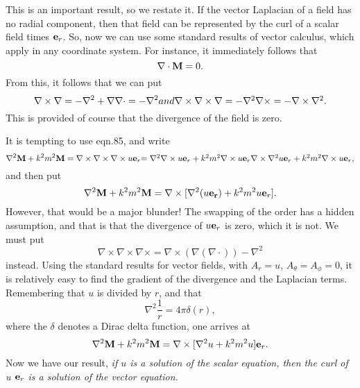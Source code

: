 This is an important result, so we restate it. If the vector Laplacian
of a field has no radial component, then that field can be represented
 by the curl of a scalar field times ${\bf e}_r$. So, now we can use
some standard results of vector calculus, which apply in any 
coordinate system. For instance, it immediately follows that
\begin{equation}
\nabla \cdot {\bf M}=0.
\end{equation}
From this, it follows that we can put
\begin{equation}
\nabla \times \nabla=-\nabla^2+ \nabla \nabla \cdot=-\nabla^2
$$ and $$
\nabla \times \nabla \times \nabla=-\nabla^2 \nabla \times
=-\nabla \times \nabla^2.
\end{equation}
This is provided of course that the divergence of the field is zero.

It is tempting to use eqn.85, and write
\begin{equation}
\nabla^2 {\bf M}+k^2 m^2 {\bf M}
=\nabla \times \nabla \times \nabla \times u {\bf e}_r
$$    $$
=\nabla^2 \nabla \times u {\bf e}_r+k^2 m^2 \nabla \times u {\bf e}_r
  \nabla \times \nabla^2 u{\bf e}_r+k^2 m^2 \nabla \times u
{\bf e}_r,    
\end{equation}
and then put
\begin{equation}
\nabla^2 {\bf M}+k^2 m^2 {\bf M}=\nabla \times
[\nabla^2 (u {\bf e_r})+k^2 m^2 u {\bf e}_r].
\end{equation}
However, that would be a major blunder! The swapping of the
order has a hidden assumption, and that is that the divergence
of $u {\bf e}_r$ is zero, which it is not.
We must put
\begin{equation}
\nabla \times \nabla \times \nabla \times=
\nabla \times ( \nabla (\nabla \cdot))-\nabla^2 
\end{equation}
instead.
Using the standard results for vector fields, with $A_r=u$,
 $A_\theta=A_\phi=0$, it is relatively easy to  find the gradient of the divergence and the Laplacian terms. Remembering that $u$ is divided by $r$, and
that
\begin{equation}
 \nabla^2 \frac{1}{r}= 4 \pi \delta (r), 
\end{equation}
where the $\delta$ denotes a Dirac delta function,
one arrives at
\begin{equation}
\nabla^2 {\bf M}+k^2 m^2 {\bf M}=
\nabla \times [\nabla^2 u+k^2 m^2 u]{\bf e}_r.
\end{equation}
Now we have our result,
 {\it if $u$ is a solution of the scalar equation, then the curl of 
u ${\bf e}_r$ is a solution of the vector equation.}

